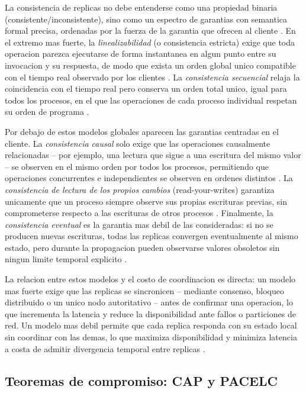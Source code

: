 \documentclass[11pt,a4paper]{article}
\begin{document}
La consistencia de replicas no debe entenderse como una propiedad binaria (consistente/inconsistente), sino como un espectro de garantias con semantica formal precisa, ordenadas por la fuerza de la garantia que ofrecen al cliente \cite{viotti2016}. En el extremo mas fuerte, la \emph{linealizabilidad} (o consistencia estricta) exige que toda operacion parezca ejecutarse de forma instantanea en algun punto entre su invocacion y su respuesta, de modo que exista un orden global unico compatible con el tiempo real observado por los clientes \cite{viotti2016}. La \emph{consistencia secuencial} relaja la coincidencia con el tiempo real pero conserva un orden total unico, igual para todos los procesos, en el que las operaciones de cada proceso individual respetan su orden de programa \cite{vansteen2017}.

Por debajo de estos modelos globales aparecen las garantias centradas en el cliente. La \emph{consistencia causal} solo exige que las operaciones causalmente relacionadas -- por ejemplo, una lectura que sigue a una escritura del mismo valor -- se observen en el mismo orden por todos los procesos, permitiendo que operaciones concurrentes e independientes se observen en ordenes distintos \cite{viotti2016}. La \emph{consistencia de lectura de los propios cambios} (read-your-writes) garantiza unicamente que un proceso siempre observe sus propias escrituras previas, sin comprometerse respecto a las escrituras de otros procesos \cite{viotti2016}. Finalmente, la \emph{consistencia eventual} es la garantia mas debil de las consideradas: si no se producen nuevas escrituras, todas las replicas convergen eventualmente al mismo estado, pero durante la propagacion pueden observarse valores obsoletos sin ningun limite temporal explicito \cite{viotti2016}.

La relacion entre estos modelos y el costo de coordinacion es directa: un modelo mas fuerte exige que las replicas se sincronicen -- mediante consenso, bloqueo distribuido o un unico nodo autoritativo -- antes de confirmar una operacion, lo que incrementa la latencia y reduce la disponibilidad ante fallos o particiones de red. Un modelo mas debil permite que cada replica responda con su estado local sin coordinar con las demas, lo que maximiza disponibilidad y minimiza latencia a costa de admitir divergencia temporal entre replicas \cite{vansteen2017}.

\subsection{Teoremas de compromiso: CAP y PACELC}
\end{document}
